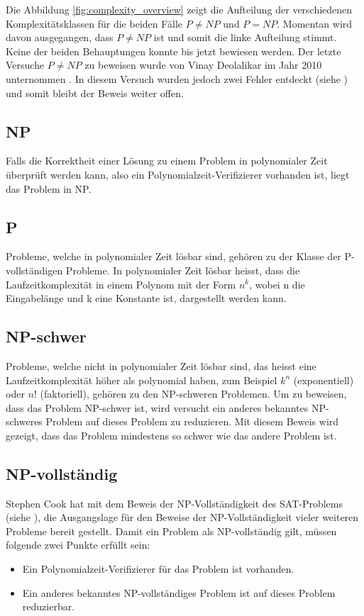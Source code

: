Die Abbildung \ref{fig:complexity_overview} zeigt die Aufteilung der verschiedenen Komplexitätsklassen für die beiden Fälle $P \neq NP$ und $P=NP$. Momentan wird davon ausgegangen, dass $P \neq NP$ ist und somit die linke Aufteilung stimmt. Keine der beiden Behauptungen konnte bis jetzt bewiesen werden. Der letzte Versuche $P \neq NP$ zu beweisen wurde von Vinay Deolalikar im Jahr 2010 unternommen \cite{p_neq_np_paper}. In diesem Versuch wurden jedoch zwei Fehler entdeckt (siehe \cite{p_neq_np_paper_blog}) und somit bleibt der Beweis weiter offen.

\subsection{NP}\label{np}
Falls die Korrektheit einer Lösung zu einem Problem in polynomialer Zeit überprüft werden kann, also ein Polynomialzeit-Verifizierer vorhanden ist, liegt das Problem in NP.

\subsection{P}\label{p_complet}
Probleme, welche in polynomialer Zeit lösbar sind, gehören zu der Klasse der P-vollständigen Probleme. In polynomialer Zeit lösbar heisst, dass die Laufzeitkomplexität in einem Polynom mit der Form $n^k$, wobei n die Eingabelänge und k eine Konstante ist, dargestellt werden kann.

\subsection{NP-schwer}\label{np_hard}
Probleme, welche nicht in polynomialer Zeit lösbar sind, das heisst eine Laufzeitkomplexität höher als polynomial haben, zum Beispiel $k^n$ (exponentiell) oder $n!$ (faktoriell), gehören zu den NP-schweren Problemen. Um zu beweisen, dass das Problem NP-schwer ist, wird versucht ein anderes bekanntes NP-schweres Problem auf dieses Problem zu reduzieren. Mit diesem Beweis wird gezeigt, dass das Problem mindestens so schwer wie das andere Problem ist.

\subsection{NP-vollständig}\label{np_complet}
Stephen Cook hat mit dem Beweis der NP-Vollständigkeit des SAT-Problems (siehe \cite{cook_complexity}), die Ausgangslage für den Beweise der NP-Vollständigkeit vieler weiteren Probleme bereit gestellt. Damit ein Problem als NP-vollständig gilt, müssen folgende zwei Punkte erfüllt sein:
\begin{itemize}
	\item Ein Polynomialzeit-Verifizierer für das Problem ist vorhanden.
	\item Ein anderes bekanntes NP-vollständiges Problem ist auf dieses Problem reduzierbar.
\end{itemize}

